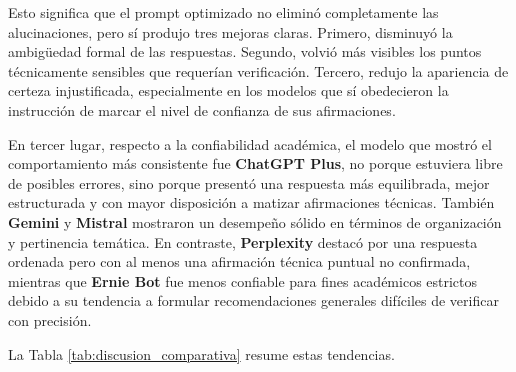 \documentclass[11pt,a4paper]{article}
\begin{document}
Esto significa que el prompt optimizado no eliminó completamente las alucinaciones, pero sí produjo tres mejoras claras. Primero, disminuyó la ambigüedad formal de las respuestas. Segundo, volvió más visibles los puntos técnicamente sensibles que requerían verificación. Tercero, redujo la apariencia de certeza injustificada, especialmente en los modelos que sí obedecieron la instrucción de marcar el nivel de confianza de sus afirmaciones.

En tercer lugar, respecto a la confiabilidad académica, el modelo que mostró el comportamiento más consistente fue \textbf{ChatGPT Plus}, no porque estuviera libre de posibles errores, sino porque presentó una respuesta más equilibrada, mejor estructurada y con mayor disposición a matizar afirmaciones técnicas. También \textbf{Gemini} y \textbf{Mistral} mostraron un desempeño sólido en términos de organización y pertinencia temática. En contraste, \textbf{Perplexity} destacó por una respuesta ordenada pero con al menos una afirmación técnica puntual no confirmada, mientras que \textbf{Ernie Bot} fue menos confiable para fines académicos estrictos debido a su tendencia a formular recomendaciones generales difíciles de verificar con precisión.

La Tabla \ref{tab:discusion_comparativa} resume estas tendencias.
\end{document}
